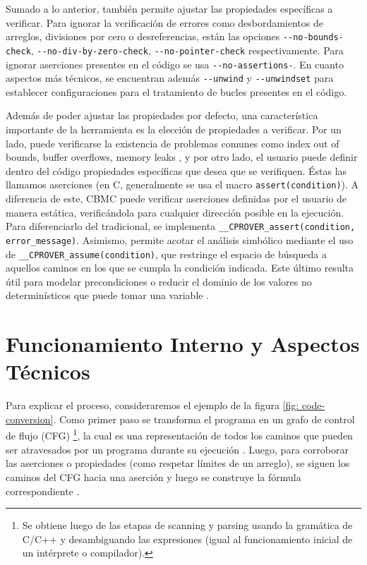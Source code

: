 \documentclass[runningheads]{llncs}
\begin{document}
Sumado a lo anterior, también permite ajustar las propiedades específicas a verificar.
Para ignorar la verificación de errores como desbordamientos de arreglos, divisiones por cero o desreferencias, están las opciones \verb|--no-bounds-check|, 
\verb|--no-div-by-zero-check|, \verb|--no-pointer-check| respectivamente.
Para ignorar aserciones presentes en el código se usa \verb|--no-assertions-|.
En cuanto aspectos más técnicos, se encuentran además \verb|--unwind| y \verb|--unwindset| para establecer configuraciones para el tratamiento de bucles presentes en el código. \cite{cbmc-manual}

Además de poder ajustar las propiedades por defecto, una característica importante de la herramienta es la elección de propiedades a verificar.
Por un lado, puede verificarse la existencia de problemas comunes como index out of bounds, buffer overflows, memory leaks \cite{cbmc-paper}, y por otro lado,
el usuario puede definir dentro del código propiedades específicas que desea que se verifiquen.
Éstas las llamamos aserciones (en C, generalmente se usa el macro \verb|assert(condition)|).
A diferencia de este, CBMC puede verificar aserciones definidas por el usuario de manera estática, verificándola para cualquier dirección posible en la ejecución.
Para diferenciarlo del tradicional, se implementa \verb|__CPROVER_assert(condition, error_message)|.
Asimismo, permite acotar el análisis simbólico mediante el uso de \verb|__CPROVER_assume(condition)|, que restringe el espacio de búsqueda a aquellos caminos 
en los que se cumpla la condición indicada.
Este último resulta útil para modelar precondiciones o reducir el dominio de los valores no determinísticos que puede tomar una variable \cite{cbmc-paper}.

%
\section{Funcionamiento Interno y Aspectos Técnicos}
Para explicar el proceso, consideraremos el ejemplo de la figura \ref{fig: code-conversion}.
Como primer paso se transforma el programa en un grafo de control de flujo (CFG) \footnote{Se obtiene luego de las etapas de scanning y parsing usando la 
gramática de C/C++ y desambiguando las expresiones (igual al funcionamiento inicial de un intérprete o compilador).}, la cual es una representación de 
todos los caminos que pueden ser atravesados por un programa durante su ejecución \cite{cbmc-slides}.
Luego, para corroborar las aserciones o propiedades (como respetar límites de un arreglo), se siguen los caminos del CFG hacia una aserción y luego se construye 
la fórmula correspondiente \cite{cbmc-slides}.
\end{document}
